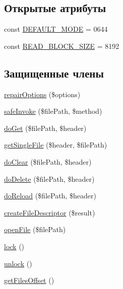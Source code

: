 \subsection*{Открытые атрибуты}
\begin{DoxyCompactItemize}
\item 
const \hyperlink{classphpMorphy__Shm__Cache_a96b6b32f41985d19129943700b43da2d}{DEFAULT\_\-MODE} = 0644
\item 
const \hyperlink{classphpMorphy__Shm__Cache_a770972d5d9c31a0148a161d3b5a4a70d}{READ\_\-BLOCK\_\-SIZE} = 8192
\end{DoxyCompactItemize}
\subsection*{Защищенные члены}
\begin{DoxyCompactItemize}
\item 
\hyperlink{classphpMorphy__Shm__Cache_a27292de44b49da0fec911cb69825e3ea}{repairOptions} (\$options)
\item 
\hyperlink{classphpMorphy__Shm__Cache_aae7d84bccd9286abfe3fc5cc0c5afb84}{safeInvoke} (\$filePath, \$method)
\item 
\hyperlink{classphpMorphy__Shm__Cache_ae01f1f0d4a71916baeb043bd00e3c8ba}{doGet} (\$filePath, \$header)
\item 
\hyperlink{classphpMorphy__Shm__Cache_a968c5164f333fcd6795b32cb58cfd0e6}{getSingleFile} (\$header, \$filePath)
\item 
\hyperlink{classphpMorphy__Shm__Cache_a9d25bb68cade345cea06e76cbf13a045}{doClear} (\$filePath, \$header)
\item 
\hyperlink{classphpMorphy__Shm__Cache_a12efa08d17f11e373ca682f4de7479c5}{doDelete} (\$filePath, \$header)
\item 
\hyperlink{classphpMorphy__Shm__Cache_ae19174d7bf4df9155f83c1583bc89191}{doReload} (\$filePath, \$header)
\item 
\hyperlink{classphpMorphy__Shm__Cache_ab952c8c628b8f9deb556e5c1dea56897}{createFileDescriptor} (\$result)
\item 
\hyperlink{classphpMorphy__Shm__Cache_a67c412f3246d100793e1a4331b0d06aa}{openFile} (\$filePath)
\item 
\hyperlink{classphpMorphy__Shm__Cache_a58232fd7c923b045e5f8b6c59d6e24e1}{lock} ()
\item 
\hyperlink{classphpMorphy__Shm__Cache_ac8c878907f6370a9e01b013c28e6c2a3}{unlock} ()
\item 
\hyperlink{classphpMorphy__Shm__Cache_a584a9712af379a3c5fbea1fa7b10667a}{getFilesOffset} ()

\end{DoxyCompactItemize}
